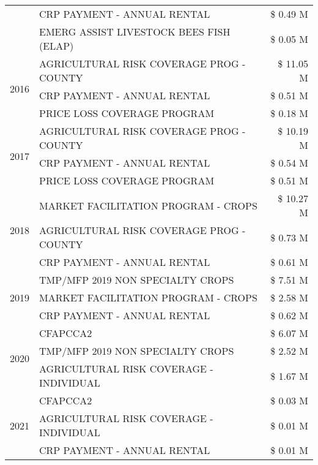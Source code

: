 \begin{tabular}{llr}
 & CRP PAYMENT - ANNUAL RENTAL & \$ 0.49 M \\
 & EMERG ASSIST LIVESTOCK BEES FISH (ELAP) & \$ 0.05 M \\
\cline{1-3}
\multirow[t]{3}{*}{2016} & AGRICULTURAL RISK COVERAGE PROG - COUNTY & \$ 11.05 M \\
 & CRP PAYMENT - ANNUAL RENTAL & \$ 0.51 M \\
 & PRICE LOSS COVERAGE PROGRAM & \$ 0.18 M \\
\cline{1-3}
\multirow[t]{3}{*}{2017} & AGRICULTURAL RISK COVERAGE PROG - COUNTY & \$ 10.19 M \\
 & CRP PAYMENT - ANNUAL RENTAL & \$ 0.54 M \\
 & PRICE LOSS COVERAGE PROGRAM & \$ 0.51 M \\
\cline{1-3}
\multirow[t]{3}{*}{2018} & MARKET FACILITATION PROGRAM - CROPS & \$ 10.27 M \\
 & AGRICULTURAL RISK COVERAGE PROG - COUNTY & \$ 0.73 M \\
 & CRP PAYMENT - ANNUAL RENTAL & \$ 0.61 M \\
\cline{1-3}
\multirow[t]{3}{*}{2019} & TMP/MFP 2019 NON SPECIALTY CROPS & \$ 7.51 M \\
 & MARKET FACILITATION PROGRAM - CROPS & \$ 2.58 M \\
 & CRP PAYMENT - ANNUAL RENTAL & \$ 0.62 M \\
\cline{1-3}
\multirow[t]{3}{*}{2020} & CFAPCCA2 & \$ 6.07 M \\
 & TMP/MFP 2019 NON SPECIALTY CROPS & \$ 2.52 M \\
 & AGRICULTURAL RISK COVERAGE - INDIVIDUAL & \$ 1.67 M \\
\cline{1-3}
\multirow[t]{3}{*}{2021} & CFAPCCA2 & \$ 0.03 M \\
 & AGRICULTURAL RISK COVERAGE - INDIVIDUAL & \$ 0.01 M \\
 & CRP PAYMENT - ANNUAL RENTAL & \$ 0.01 M \\
\cline{1-3}
\bottomrule
\end{tabular}
